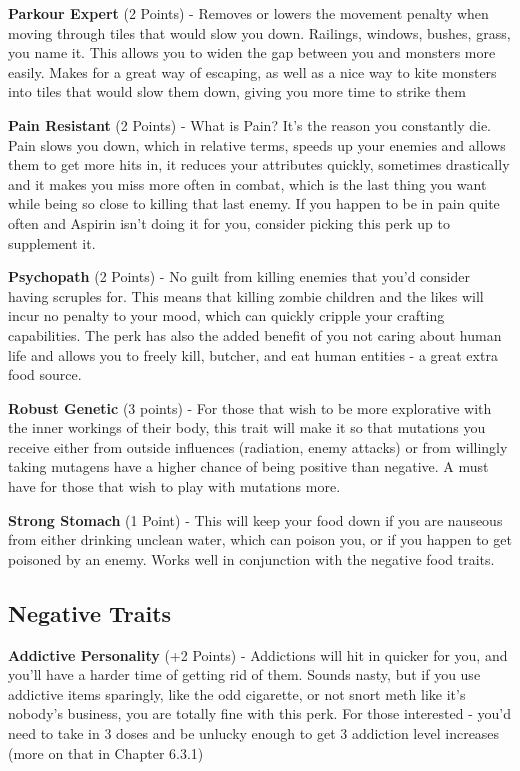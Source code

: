 \documentclass[11pt]{report}
\begin{document}
\textbf{Parkour Expert} (2 Points) - Removes or lowers the movement penalty when moving through tiles that would slow you down. Railings, windows, bushes, grass, you name it. This allows you to widen the gap between you and monsters more easily. Makes for a great way of escaping, as well as a nice way to kite monsters into tiles that would slow them down, giving you more time to strike them

\textbf{Pain Resistant} (2 Points) - What is Pain? It's the reason you constantly die. Pain slows you down, which in relative terms, speeds up your enemies and allows them to get more hits in, it reduces your attributes quickly, sometimes drastically and it makes you miss more often in combat, which is the last thing you want while being so close to killing that last enemy. If you happen to be in pain quite often and Aspirin isn't doing it for you, consider picking this perk up to supplement it.

\textbf{Psychopath} (2 Points) - No guilt from killing enemies that you'd consider having scruples for. This means that killing zombie children and the likes will incur no penalty to your mood, which can quickly cripple your crafting capabilities. The perk has also the added benefit of you not caring about human life and allows you to freely kill, butcher, and eat human entities - a great extra food source.

\textbf{Robust Genetic} (3 points) - For those that wish to be more explorative with the inner workings of their body, this trait will make it so that mutations you receive either from outside influences (radiation, enemy attacks) or from willingly taking mutagens have a higher chance of being positive than negative. A must have for those that wish to play with mutations more.

\textbf{Strong Stomach} (1 Point) - This will keep your food down if you are nauseous from either drinking unclean water, which can poison you, or if you happen to get poisoned by an enemy. Works well in conjunction with the negative food traits.

\subsection{Negative Traits}

\textbf{Addictive Personality} (+2 Points) - Addictions will hit in quicker for you, and you'll have a harder time of getting rid of them. Sounds nasty, but if you use addictive items sparingly, like the odd cigarette, or not snort meth like it's nobody's business, you are totally fine with this perk. For those interested - you'd need to take in 3 doses and be unlucky enough to get 3 addiction level increases (more on that in Chapter 6.3.1)
\end{document}
